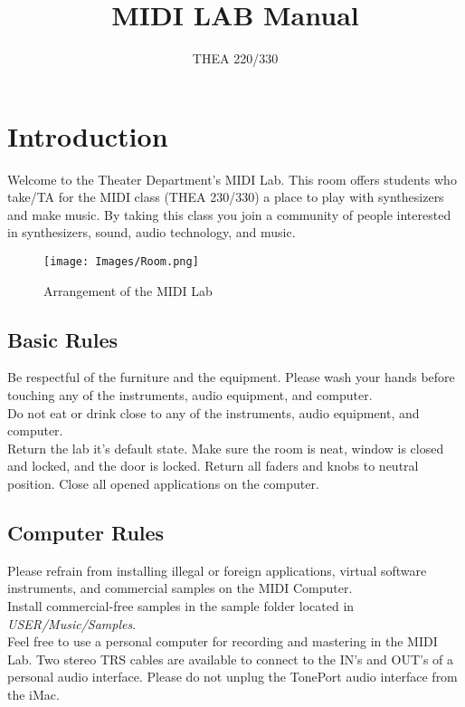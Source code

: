 \documentclass[12pt]{article}
\title{MIDI LAB Manual}
\author{THEA 220/330}
\date{}
\begin{document}


\tableofcontents

\listoffigures

\newpage
\section{Introduction}

Welcome to the  Theater Department's MIDI Lab. This room offers students who take/TA for the MIDI class (THEA 230/330) a place to play with synthesizers and make music. By taking this class you join a community of people interested in synthesizers, sound, audio technology, and music.

\begin{figure}[h]
\centering
\texttt{[image: Images/Room.png]}
\caption{Arrangement of the MIDI Lab}
\label{fig:fullfig}
\end{figure}

\subsection{Basic Rules}

Be respectful of the furniture and the equipment. Please wash your hands before touching any of the instruments, audio equipment, and computer.\\
\linebreak
Do not eat or drink close to any of the instruments, audio equipment, and computer.\\
\linebreak
Return the lab it's default state. Make sure the room is neat, window is closed and locked, and the door is locked. Return all faders and knobs to neutral position. Close all opened applications on the computer.

\subsection{Computer Rules}

Please refrain from installing illegal or foreign applications, virtual software instruments, and commercial samples on the MIDI Computer.\\
\linebreak
Install commercial-free samples in the sample folder located in \emph{USER/Music/Samples}.\\
\linebreak
Feel free to use a personal computer for recording and mastering in the MIDI Lab. Two stereo TRS cables are available to connect to the IN's and OUT's of a personal audio interface. Please do not unplug the TonePort audio interface from the iMac.

\newpage

\newpage

\newpage


\newpage

\end{document}
